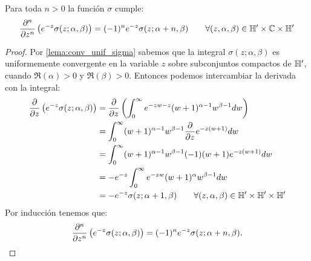 \begin{lema}\label{lema:derivar_sigma}%
  Para toda $n>0$ la funci\'on $\sigma$ cumple:
  \[
    \frac{\partial^n}{\partial z^n}\left( e^{-z}\sigma(z;\alpha,\beta) \right)=
    (-1)^ne^{-z}\sigma(z;\alpha+n,\beta) \qquad \forall(z,\alpha,\beta)\in\mathbb{H}'\times\mathbb{C}\times\mathbb{H}'
  \]
\end{lema}%
\begin{proof}
Por \ref{lema:conv_unif_sigma} sabemos que la integral $\sigma(z;\alpha,\beta)$ es uniformemente
convergente en la variable $z$ sobre subconjuntos compactos de $\mathbb{H}'$, cuando $\Re(\alpha)>0$ y
$\Re(\beta)>0$. Entonces podemos intercambiar la derivada con la integral:
\begin{align*}
  \frac{\partial}{\partial z}\left( e^{-z}\sigma(z;\alpha,\beta) \right)
  &=\frac{\partial}{\partial z}\left( \int_0^{\infty}e^{-zw-z}(w+1)^{\alpha-1}w^{\beta-1}dw \right)\\
  &=\int_0^{\infty}(w+1)^{\alpha-1}w^{\beta-1}\frac{\partial}{\partial z}e^{-z(w+1)}dw\\
  &=\int_0^{\infty}(w+1)^{\alpha-1}w^{\beta-1}(-1)(w+1)e^{-z(w+1)}dw\\
  &=-e^{-z}\int_0^{\infty}e^{-zw}(w+1)^{\alpha}w^{\beta-1}dw\\
  &=-e^{-z}\sigma(z;\alpha+1,\beta) \qquad \forall (z,\alpha,\beta)\in\mathbb{H}'\times\mathbb{H}'\times\mathbb{H}'
\end{align*}
Por inducci\'on tenemos que:
\[
  \frac{\partial^n}{\partial z^n}\left( e^{-z}\sigma(z;\alpha,\beta) \right)=
  (-1)^ne^{-z}\sigma(z;\alpha+n,\beta).
\]
\end{proof}


